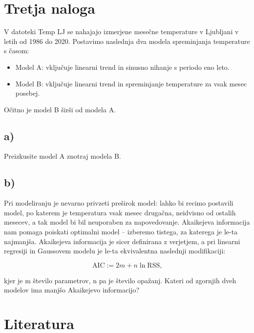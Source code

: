 \documentclass[12pt, a4paper]{article}
\begin{document}
\section*{Tretja naloga}

V datoteki Temp LJ se nahajajo izmerjene mesečne temperature v Ljubljani v 
letih od 1986 do 2020. Postavimo naslednja dva modela spreminjanja temperature
s časom: 

\begin{itemize}
     
    \item Model A: vključuje linearni trend in sinusno nihanje s periodo eno 
        leto.
    \item Model B: vključuje linearni trend in spreminjanje temperature za 
        vsak mesec posebej.

\end{itemize}

Očitno je model B širši od modela A.

\subsection*{a)}

Preizkusite model A znotraj modela B.

\subsection*{b)}
Pri modeliranju je nevarno privzeti preširok model: lahko bi recimo postavili
model, po katerem je temperatura vsak mesec drugačna, neidvisno od ostalih
mesecev, a tak model bi bil neuporaben za napovedovanje. Akaikejeva 
informacija nam pomaga poiskati optimalni model – izberemo tistega, za katerega
je le-ta najmanjša. Akaikejeva informacija je sicer definirana z verjetjem, 
a pri linearni regresiji in Gaussovem modelu je le-ta ekvivalentna naslednji 
modifikaciji:

\[
    \text{AIC} := 2m + n \ln \text{RSS,}
    \]

kjer je m število parametrov, n pa je število opažanj. Kateri od zgornjih dveh
modelov ima manjšo Akaikejevo informacijo?



\section*{Literatura}
\end{document}
